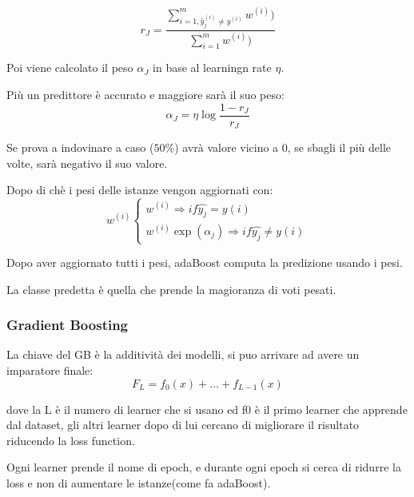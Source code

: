 \begin{equation}
    r_J = \frac{
        \sum_{i=1, \hat{y}_j^{(i)}\neq y^{(i)}}^{m} w^{(i)})
    }{
        \sum_{i=1}^{m} w^{(i)})
    }
\end{equation}

Poi viene calcolato il peso $\alpha_J$ in base al learningn rate $\eta$.

Più un predittore è accurato e maggiore sarà il suo peso:
\begin{equation}
    \alpha_J = \eta\log\frac{1-r_J}{r_J}
\end{equation}

Se prova a indovinare a caso ($50\%$) avrà valore vicino a 0, se sbagli il più
delle volte, sarà negativo il suo valore.


Dopo di chè i pesi delle istanze vengon aggiornati con:
\begin{equation}
    w^{(i)}
    \begin{cases}
        w^{(i)} \Rightarrow if \hat{y_j}=y(i) \\
        w^{(i)} \exp(\alpha_j) \Rightarrow if \hat{y_j}\neq y(i)
    \end{cases}
\end{equation}

Dopo aver aggiornato tutti i pesi, adaBoost computa la predizione usando i pesi.

La classe predetta è quella che prende la magioranza di voti pesati.

\subsubsection{Gradient Boosting}
La chiave del GB è la additività dei modelli, si puo arrivare ad avere
un imparatore finale:
\begin{equation*}
    F_L=f_0(x) + \dots + f_{L-1}(x)
\end{equation*}

dove la L è il numero di learner che si usano ed f0 è il primo learner che apprende
dal dataset, gli altri learner dopo di lui cercano di migliorare il risultato
riducendo la loss function.

Ogni learner prende il nome di epoch, e durante ogni epoch si cerca di ridurre la
loss e non di aumentare le istanze(come fa adaBoost).



































